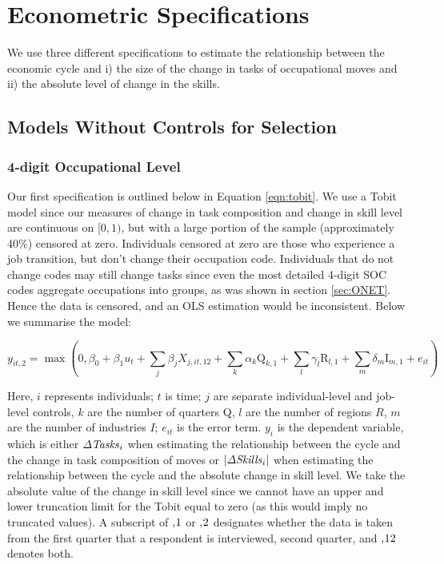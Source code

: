 \documentclass[11pt, oneside]{article}
\begin{document}
 \section{Econometric Specifications}
\label{sec:Model}

We use three different specifications to estimate the relationship between the economic cycle and i) the size of the change in tasks of occupational moves and ii) the absolute level of change in the skills.

\subsection{Models Without Controls for Selection}
\label{sec:Tobits}

\subsubsection{4-digit Occupational Level}
Our first specification is outlined below in Equation \ref{eqn:tobit}. We use a Tobit model since our measures of change in task composition and change in skill level are continuous on $[0,1)$, but with a large portion of the sample (approximately 40\%) censored at zero. Individuals censored at zero are those who experience a job transition, but don't change their occupation code. Individuals that do not change codes may still change tasks since even the most detailed 4-digit SOC codes aggregate occupations into groups, as was shown in section \ref{sec:ONET}. Hence the data is censored, and an OLS estimation would be inconsistent. Below we summarise the model:

\begin{equation}
\label{eqn:tobit}
y_{it,2} =\max(0,\beta_0 + \beta_{1}u_{t} + \sum_{j} \beta_{j}X_{j,it,12} + \sum_{k} \alpha_{k} \text{Q}_{k,1} + \sum_{l} \gamma_{l} \text{R}_{l,1} + \sum_{m} \delta_{m} \text{I}_{m,1}+ e_{it})
\end{equation}

\noindent Here, $i$ represents individuals; $t$ is time; $j$ are separate individual-level and job-level controls, $k$ are the number of quarters Q, $l$ are the number of regions $R$, $m$ are the number of industries $I$; $e_{it}$ is the error term. $y_{i}$ is the dependent variable, which is either $\Delta\text{\textit{Tasks}}_{i}$ when estimating the relationship between the cycle and the change in task composition of moves or $|\Delta\text{\textit{Skills}}_{i}|$ when estimating the relationship between the cycle and the absolute change in skill level. We take the absolute value of the change in skill level since we cannot have an upper and lower truncation limit for the Tobit equal to zero (as this would imply no truncated values). A subscript of $,\hspace{-0.5mm}1$ or $,\hspace{-0.5mm}2$ designates whether the data is taken from the first quarter that a respondent is interviewed, second quarter, and $,\hspace{-0.5mm}12$ denotes both.
\end{document}
